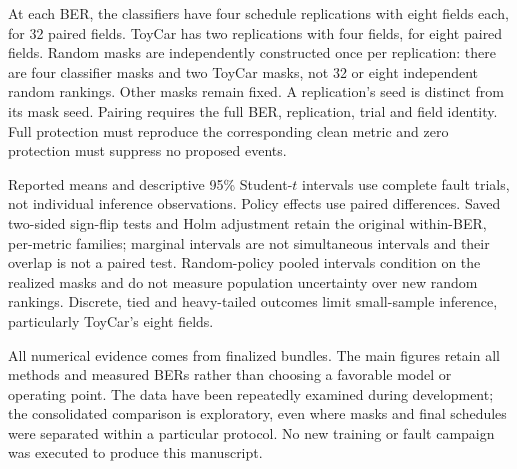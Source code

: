 At each BER, the classifiers have four schedule replications with eight fields
each, for 32 paired fields. ToyCar has two replications with four fields, for
eight paired fields. Random masks are independently constructed once per
replication: there are four classifier masks and two ToyCar masks, not 32 or
eight independent random rankings. Other masks remain fixed. A replication's
seed is distinct from its mask seed. Pairing requires the full BER, replication,
trial and field identity. Full protection must reproduce the corresponding
clean metric and zero protection must suppress no proposed events.

Reported means and descriptive 95\% Student-$t$ intervals use complete fault
trials, not individual inference observations. Policy effects use paired
differences. Saved two-sided sign-flip tests and Holm adjustment retain the
original within-BER, per-metric families; marginal intervals are not simultaneous
intervals and their overlap is not a paired test. Random-policy pooled intervals
condition on the realized masks and do not measure population uncertainty over
new random rankings. Discrete, tied and heavy-tailed outcomes limit small-sample
inference, particularly ToyCar's eight fields.

All numerical evidence comes from finalized bundles. The main figures retain all
methods and measured BERs rather than choosing a favorable model or operating
point. The data have been repeatedly examined during development; the consolidated
comparison is exploratory, even where masks and final schedules were separated
within a particular protocol. No new training or fault campaign was executed to
produce this manuscript.
